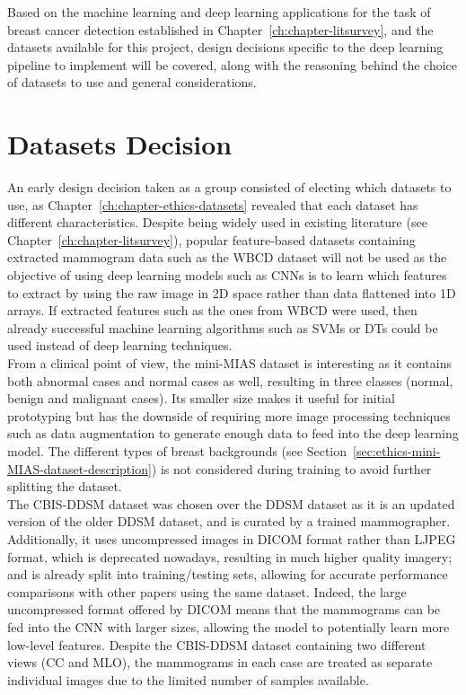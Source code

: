 Based on the machine learning and deep learning applications for the task of breast cancer detection established in Chapter~\ref{ch:chapter-litsurvey}, and the datasets available for this project, design decisions specific to the deep learning pipeline to implement will be covered, along with the reasoning behind the choice of datasets to use and general considerations.

\section{Datasets Decision}

An early design decision taken as a group consisted of electing which datasets to use, as Chapter~\ref{ch:chapter-ethics-datasets} revealed that each dataset has different characteristics. Despite being widely used in existing literature (see Chapter~\ref{ch:chapter-litsurvey}), popular feature-based datasets containing extracted mammogram data such as the WBCD dataset \citep{Wolberg1995} will not be used as the objective of using deep learning models such as CNNs is to learn which features to extract by using the raw image in 2D space rather than data flattened into 1D arrays. If extracted features such as the ones from WBCD were used, then already successful machine learning algorithms such as SVMs or DTs could be used instead of deep learning techniques.\\

From a clinical point of view, the mini-MIAS dataset is interesting as it contains both abnormal cases and normal cases as well, resulting in three classes (normal, benign and malignant cases). Its smaller size makes it useful for initial prototyping but has the downside of requiring more image processing techniques such as data augmentation to generate enough data to feed into the deep learning model. The different types of breast backgrounds (see Section~\ref{sec:ethics-mini-MIAS-dataset-description}) is not considered during training to avoid further splitting the dataset.\\

The CBIS-DDSM dataset was chosen over the DDSM dataset as it is an updated version of the older DDSM dataset, and is curated by a trained mammographer. Additionally, it uses uncompressed images in DICOM format rather than LJPEG format, which is deprecated nowadays, resulting in much higher quality imagery; and is already split into training/testing sets, allowing for accurate performance comparisons with other papers using the same dataset. Indeed, the large uncompressed format offered by DICOM means that the mammograms can be fed into the CNN with larger sizes, allowing the model to potentially learn more low-level features. Despite the CBIS-DDSM dataset containing two different views (CC and MLO), the mammograms in each case are treated as separate individual images due to the limited number of samples available.\\

